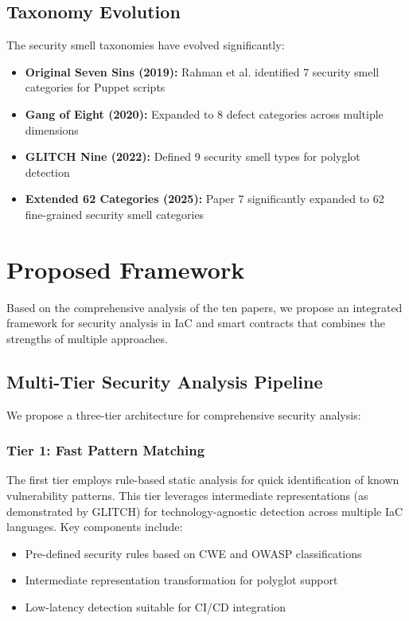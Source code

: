 \documentclass[11pt,a4paper]{article}
\begin{document}
\subsection{Taxonomy Evolution}

The security smell taxonomies have evolved significantly:

\begin{itemize}
    \item \textbf{Original Seven Sins (2019):} Rahman et al. identified 7 security smell categories for Puppet scripts
    \item \textbf{Gang of Eight (2020):} Expanded to 8 defect categories across multiple dimensions
    \item \textbf{GLITCH Nine (2022):} Defined 9 security smell types for polyglot detection
    \item \textbf{Extended 62 Categories (2025):} Paper 7 significantly expanded to 62 fine-grained security smell categories
\end{itemize}

\section{Proposed Framework}

Based on the comprehensive analysis of the ten papers, we propose an integrated framework for security analysis in IaC and smart contracts that combines the strengths of multiple approaches.

\subsection{Multi-Tier Security Analysis Pipeline}

We propose a three-tier architecture for comprehensive security analysis:

\subsubsection{Tier 1: Fast Pattern Matching}
The first tier employs rule-based static analysis for quick identification of known vulnerability patterns. This tier leverages intermediate representations (as demonstrated by GLITCH) for technology-agnostic detection across multiple IaC languages. Key components include:
\begin{itemize}
    \item Pre-defined security rules based on CWE and OWASP classifications
    \item Intermediate representation transformation for polyglot support
    \item Low-latency detection suitable for CI/CD integration
\end{itemize}
\end{document}
